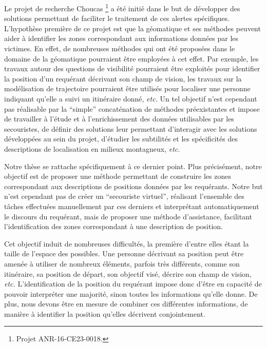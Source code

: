 Le projet de recherche Choucas \footnote{Projet ANR-16-CE23-0018.} a
été initié dans le but de développer des solutions permettant de
faciliter le traitement de ces alertes spécifiques. L'hypothèse
première de ce projet est que la géomatique et ses méthodes peuvent
aider à identifier les zones correspondant aux informations données
par les victimes. En effet, de nombreuses méthodes qui ont été
proposées dans le domaine de la géomatique pourraient être employées à
cet effet. Par exemple, les travaux autour des questions de visibilité
pourraient être exploités pour identifier la position d'un requérant
décrivant son champ de vision, les travaux sur la modélisation de
trajectoire pourraient être utilisés pour localiser une personne
indiquant qu'elle a suivi un itinéraire donné, \emph{etc.} Un tel
objectif n'est cependant pas réalisable par la \enquote{simple}
concaténation de méthodes préexistantes et impose de travailler à
l'étude et à l’enrichissement des données utilisables par les
secouristes, de définir des solutions leur permettant d’interagir avec
les solutions développées au sein du projet, d'étudier les subtilités
et les spécificités des descriptions de localisation en milieux
montagneux, \emph{etc.}

Notre thèse se rattache spécifiquement à ce dernier point. Plus
précisément, notre objectif est de proposer une méthode permettant de
construire les zones correspondant aux descriptions de positions
données par les requérants. Notre but n'est cependant pas de créer un
\enquote{secouriste virtuel}, réalisant l'ensemble des tâches
effectuées manuellement par ces derniers et interprétant
automatiquement le discours du requérant, mais de proposer une méthode
d'assistance, facilitant l'identification des zones correspondant à
une description de position.

Cet objectif induit de nombreuses difficultés, la première d'entre
elles étant la taille de l'espace des possibles. Une personne
décrivant sa position peut être amenée à utiliser de nombreux
éléments, parfois très différents, comme son itinéraire, sa position
de départ, son objectif visé, décrire son champ de vision, \emph{etc.}
L'identification de la position du requérant impose donc d'être en
capacité de pouvoir interpréter une majorité, sinon toutes les
informations qu'elle donne. De plus, nous devons être en mesure de
combiner ces différentes informations, de manière à identifier la
position qu'elles décrivent conjointement.

